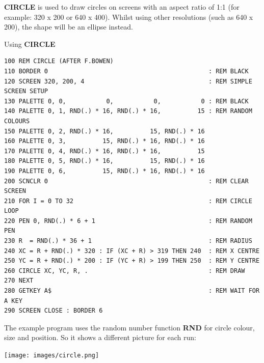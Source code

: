 \begin{description}[leftmargin=2cm,style=nextline]
\item [Remarks:] {\bf CIRCLE} is used to draw circles on screens with an aspect ratio of 1:1 (for example: 320 x 200 or 640 x 400). Whilst using other resolutions (such as 640 x 200), the shape will be an ellipse instead.

\item [Example:] Using {\bf CIRCLE}

\begin{tcolorbox}[colback=black,coltext=white]
\verbatimfont{\codefont}
\begin{verbatim}
100 REM CIRCLE (AFTER F.BOWEN)
110 BORDER 0                                            : REM BLACK
120 SCREEN 320, 200, 4                                  : REM SIMPLE SCREEN SETUP
130 PALETTE 0, 0,           0,           0,           0 : REM BLACK
140 PALETTE 0, 1, RND(.) * 16, RND(.) * 16,          15 : REM RANDOM COLOURS
150 PALETTE 0, 2, RND(.) * 16,          15, RND(.) * 16
160 PALETTE 0, 3,          15, RND(.) * 16, RND(.) * 16
170 PALETTE 0, 4, RND(.) * 16, RND(.) * 16,          15
180 PALETTE 0, 5, RND(.) * 16,          15, RND(.) * 16
190 PALETTE 0, 6,          15, RND(.) * 16, RND(.) * 16
200 SCNCLR 0                                            : REM CLEAR SCREEN
210 FOR I = 0 TO 32                                     : REM CIRCLE LOOP
220 PEN 0, RND(.) * 6 + 1                               : REM RANDOM PEN
230 R  = RND(.) * 36 + 1                                : REM RADIUS
240 XC = R + RND(.) * 320 : IF (XC + R) > 319 THEN 240  : REM X CENTRE
250 YC = R + RND(.) * 200 : IF (YC + R) > 199 THEN 250  : REM Y CENTRE
260 CIRCLE XC, YC, R, .                                 : REM DRAW
270 NEXT
280 GETKEY A$                                           : REM WAIT FOR A KEY
290 SCREEN CLOSE : BORDER 6
\end{verbatim}
\end{tcolorbox}

                 The example program uses the random number function {\bf RND} for circle colour, size and position. So it shows a different picture for each run:

\item \begin{center}\texttt{[image: images/circle.png]}\end{center}

\end{description}


\newpage
